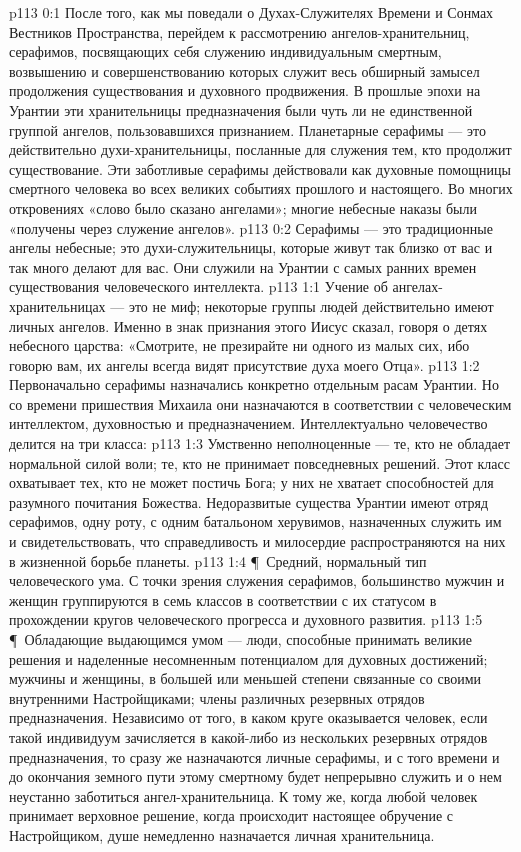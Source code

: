 \vs p113 0:1 После того, как мы поведали о Духах\hyp{}Служителях Времени и Сонмах Вестников Пространства, перейдем к рассмотрению ангелов\hyp{}хранительниц, серафимов, посвящающих себя служению индивидуальным смертным, возвышению и совершенствованию которых служит весь обширный замысел продолжения существования и духовного продвижения. В прошлые эпохи на Урантии эти хранительницы предназначения были чуть ли не единственной группой ангелов, пользовавшихся признанием. Планетарные серафимы --- это действительно духи\hyp{}хранительницы, посланные для служения тем, кто продолжит существование. Эти заботливые серафимы действовали как духовные помощницы смертного человека во всех великих событиях прошлого и настоящего. Во многих откровениях «слово было сказано ангелами»; многие небесные наказы были «получены через служение ангелов».
\vs p113 0:2 Серафимы --- это традиционные ангелы небесные; это духи\hyp{}служительницы, которые живут так близко от вас и так много делают для вас. Они служили на Урантии с самых ранних времен существования человеческого интеллекта.
\vs p113 1:1 Учение об ангелах\hyp{}хранительницах --- это не миф; некоторые группы людей действительно имеют личных ангелов. Именно в знак признания этого Иисус сказал, говоря о детях небесного царства: «Смотрите, не презирайте ни одного из малых сих, ибо говорю вам, их ангелы всегда видят присутствие духа моего Отца».
\vs p113 1:2 Первоначально серафимы назначались конкретно отдельным расам Урантии. Но со времени пришествия Михаила они назначаются в соответствии с человеческим интеллектом, духовностью и предназначением. Интеллектуально человечество делится на три класса:
\vs p113 1:3 \bibnobreakspace Умственно неполноценные --- те, кто не обладает нормальной силой воли; те, кто не принимает повседневных решений. Этот класс охватывает тех, кто не может постичь Бога; у них не хватает способностей для разумного почитания Божества. Недоразвитые существа Урантии имеют отряд серафимов, одну роту, с одним батальоном херувимов, назначенных служить им и свидетельствовать, что справедливость и милосердие распространяются на них в жизненной борьбе планеты.
\vs p113 1:4 \P\ \bibnobreakspace Средний, нормальный тип человеческого ума. С точки зрения служения серафимов, большинство мужчин и женщин группируются в семь классов в соответствии с их статусом в прохождении кругов человеческого прогресса и духовного развития.
\vs p113 1:5 \P\ \bibnobreakspace Обладающие выдающимся умом --- люди, способные принимать великие решения и наделенные несомненным потенциалом для духовных достижений; мужчины и женщины, в большей или меньшей степени связанные со своими внутренними Настройщиками; члены различных резервных отрядов предназначения. Независимо от того, в каком круге оказывается человек, если такой индивидуум зачисляется в какой\hyp{}либо из нескольких резервных отрядов предназначения, то сразу же назначаются личные серафимы, и с того времени и до окончания земного пути этому смертному будет непрерывно служить и о нем неустанно заботиться ангел\hyp{}хранительница. К тому же, когда любой человек принимает  верховное решение, когда происходит настоящее обручение с Настройщиком, душе немедленно назначается личная хранительница.
